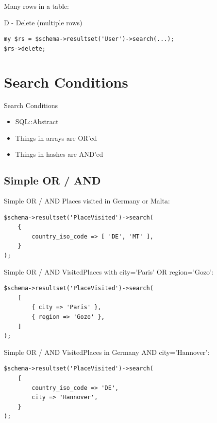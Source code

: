 Many rows in a table:

\begin{frame}[fragile]{D - Delete (multiple rows)}
\begin{lstlisting}
my $rs = $schema->resultset('User')->search(...);
$rs->delete;
\end{lstlisting}
\end{frame}

\section{Search Conditions}

\begin{frame}{Search Conditions}
\begin{itemize}
\item SQL::Abstract
\item Things in arrays are OR'ed
\item Things in hashes are AND'ed
\end{itemize}
\end{frame}

\subsection{Simple OR / AND}
\begin{frame}[fragile]{Simple OR / AND}
Places visited in Germany or Malta:
\begin{lstlisting}
$schema->resultset('PlaceVisited')->search(
    {
        country_iso_code => [ 'DE', 'MT' ],
    }
);
\end{lstlisting}
\end{frame}

\begin{frame}[fragile]{Simple OR / AND}
VisitedPlaces with city='Paris' OR region='Gozo':

\begin{lstlisting}
$schema->resultset('PlaceVisited')->search(
    [
        { city => 'Paris' },
        { region => 'Gozo' },
    ]
);
\end{lstlisting}
\end{frame}

\begin{frame}[fragile]{Simple OR / AND}
VisitedPlaces in Germany AND city='Hannover':

\begin{lstlisting}
$schema->resultset('PlaceVisited')->search(
    {
        country_iso_code => 'DE',
        city => 'Hannover',
    }
);
\end{lstlisting}
\end{frame}

